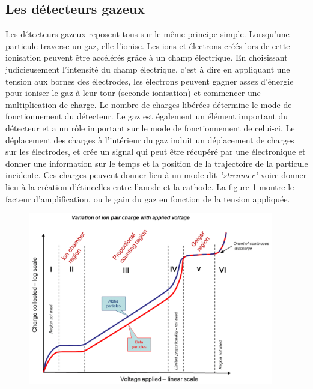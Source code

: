 \subsection{Les détecteurs gazeux}
Les détecteurs gazeux reposent tous sur le même principe simple. Lorsqu'une particule traverse un gaz, elle l'ionise. Les ions et électrons créés lors de cette ionisation peuvent être accélérés grâce à un champ électrique. En choisissant judicieusement l'intensité du champ électrique, c'est à dire en appliquant une tension aux bornes des électrodes, les électrons peuvent gagner assez d'énergie pour ioniser le gaz à leur tour (seconde ionisation) et commencer une multiplication de charge. Le nombre de charges libérées détermine le mode de fonctionnement du détecteur. Le gaz est également un élément important du détecteur et a un rôle important sur le mode de fonctionnement de celui-ci. Le déplacement des charges à l'intérieur du gaz induit un déplacement de charges sur les électrodes, et crée un signal qui peut être récupéré par une électronique et donner une information sur le temps et la position de la trajectoire de la particule incidente. Ces charges peuvent donner lieu à un mode dit \textit{"streamer"} voire donner lieu à la création d'étincelles entre l'anode et la cathode. La figure \ref{mult} montre le facteur d'amplification, ou le gain du gaz en fonction de la tension appliquée. 

\begin{figure}[ht!]
	\centering
	\includegraphics[width=0.95\textwidth]{RPC/gasgain.png}
	\label{mult}
\end{figure}

